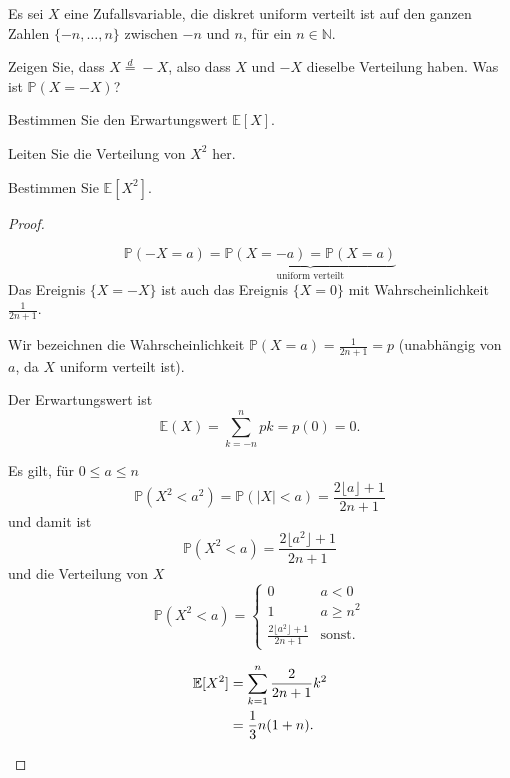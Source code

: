 \begin{Problem}
	Es sei $X$ eine Zufallsvariable, die diskret uniform verteilt ist auf den ganzen Zahlen $\{-n, \ldots, n\}$ zwischen $-n$ und $n$, für ein $n \in \mathbb{N}$.
	
	\begin{parts}
		\item Zeigen Sie, dass $X \overset{d}{=} -X$, also dass $X$ und $-X$ dieselbe Verteilung haben.  
		Was ist $\mathbb{P}(X = -X)$?
		
		\item Bestimmen Sie den Erwartungswert $\mathbb{E}[X]$.
		
		\item Leiten Sie die Verteilung von $X^2$ her.
		
		\item Bestimmen Sie $\mathbb{E}[X^2]$.
	\end{parts}
\end{Problem}
\begin{proof}
	\begin{parts}
		\item \[\mathbb{P}(-X=a) = \underbrace{\mathbb{P}(X = -a)=\mathbb{P}(X=a)}_\text{uniform verteilt}\]
		Das Ereignis $\{X=-X\}$ ist auch das Ereignis $\{X=0\}$ mit Wahrscheinlichkeit $\frac 1{2n+1}$.
		\item Wir bezeichnen die Wahrscheinlichkeit $\mathbb{P}(X=a)=\frac{1}{2n+1}=p$ (unabhängig von $a$, da $X$ uniform verteilt ist).
		
		Der Erwartungswert ist
		\[\mathbb{E}(X)=\sum_{k=-n}^n pk = p(0)=0.\]
		\item Es gilt, f\"{u}r $0 \le a \le n$
		\[\mathbb{P}(X^2<a^2)=\mathbb{P}(|X| < a)=\frac{2\lfloor a \rfloor + 1}{2n+1}\]
		und damit ist
		\[\mathbb{P}(X^2 < a)=\frac{2\lfloor a^2\rfloor + 1}{2n+1}\]
		und die Verteilung von $X$
		\[\mathbb{P}(X^2 < a)=\begin{cases}
			0 & a < 0\\
			1 & a \ge n^2\\
			\frac{2\lfloor a^2\rfloor +1}{2n+1} & \text{sonst.}
		\end{cases}\]
		\item
		\begin{align*}
			\mathbb{E}[X^2]&=\sum_{k=1}^n \frac{2}{2n+1}k^2\\
			&=\frac 13 n(1+n).\qedhere
		\end{align*}
	\end{parts}
\end{proof}
